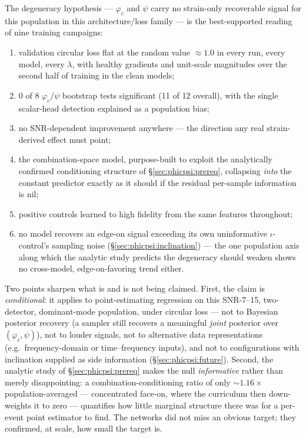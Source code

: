 \documentclass[11pt]{article}
\begin{document}
The degeneracy hypothesis --- $\varphi_c$ and $\psi$ carry no strain-only recoverable signal for this population in this architecture/loss family --- is the best-supported reading of nine training campaigns:
\begin{enumerate}
\item validation circular loss flat at the random value $\approx 1.0$ in every run, every model, every $\lambda$, with healthy gradients and unit-scale magnitudes over the second half of training in the clean models;
\item 0 of 8 $\varphi_c/\psi$ bootstrap tests significant (11 of 12 overall), with the single scalar-head detection explained as a population bias;
\item no SNR-dependent improvement anywhere --- the direction any real strain-derived effect must point;
\item the combination-space model, purpose-built to exploit the analytically confirmed conditioning structure of \S\ref{sec:phicpsi:prereq}, collapsing \emph{into} the constant predictor exactly as it should if the residual per-sample information is nil;
\item positive controls learned to high fidelity from the same features throughout;
\item no model recovers an edge-on signal exceeding its own uninformative $\iota$-control's sampling noise (\S\ref{sec:phicpsi:inclination}) --- the one population axis along which the analytic study predicts the degeneracy should weaken shows no cross-model, edge-on-favoring trend either.
\end{enumerate}

Two points sharpen what is and is not being claimed.
First, the claim is \emph{conditional}: it applies to point-estimating regression on this SNR-7--15, two-detector, dominant-mode population, under circular loss --- not to Bayesian posterior recovery (a sampler still recovers a meaningful \emph{joint} posterior over $(\varphi_c, \psi)$), not to louder signals, not to alternative data representations (e.g.\ frequency-domain or time--frequency inputs), and not to configurations with inclination supplied as side information (\S\ref{sec:phicpsi:future}).
Second, the analytic study of \S\ref{sec:phicpsi:prereq} makes the null \emph{informative} rather than merely disappointing: a combination-conditioning ratio of only ${\sim}1.16\times$ population-averaged --- concentrated face-on, where the curriculum then down-weights it to zero --- quantifies how little marginal structure there was for a per-event point estimator to find.
The networks did not miss an obvious target; they confirmed, at scale, how small the target is.
\end{document}

